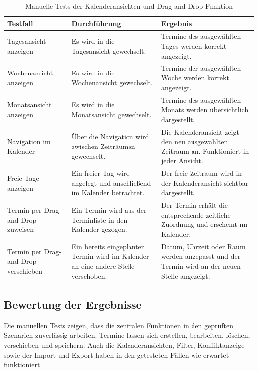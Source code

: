 \documentclass[12pt,a4paper]{article}
\begin{document}
\begin{table}[H]
\centering
\small
\caption{Manuelle Tests der Kalenderansichten und Drag-and-Drop-Funktion}
\label{tab:test-kalender-dragdrop}
\begin{tabularx}{\textwidth}{|L{3cm}|Y|Y|}
\hline
\textbf{Testfall} & \textbf{Durchführung} & \textbf{Ergebnis} \\
\hline
Tagesansicht anzeigen & Es wird in die Tagesansicht gewechselt. & Termine des ausgewählten Tages werden korrekt angezeigt. \\
\hline
Wochenansicht anzeigen & Es wird in die Wochenansicht gewechselt. & Termine der ausgewählten Woche werden korrekt angezeigt. \\
\hline
Monatsansicht anzeigen & Es wird in die Monatsansicht gewechselt. & Termine des ausgewählten Monats werden übersichtlich dargestellt. \\
\hline
Navigation im Kalender & Über die Navigation wird zwischen Zeiträumen gewechselt. & Die Kalenderansicht zeigt den neu ausgewählten Zeitraum an. Funktioniert in jeder Ansicht. \\
\hline
Freie Tage anzeigen & Ein freier Tag wird angelegt und anschließend im Kalender betrachtet. & Der freie Zeitraum wird in der Kalenderansicht sichtbar dargestellt. \\
\hline
Termin per Drag-and-Drop zuweisen & Ein Termin wird aus der Terminliste in den Kalender gezogen. & Der Termin erhält die entsprechende zeitliche Zuordnung und erscheint im Kalender. \\
\hline
Termin per Drag-and-Drop verschieben & Ein bereits eingeplanter Termin wird im Kalender an eine andere Stelle verschoben. & Datum, Uhrzeit oder Raum werden angepasst und der Termin wird an der neuen Stelle angezeigt. \\
\hline
\end{tabularx}
\end{table}

\FloatBarrier

\subsection{Bewertung der Ergebnisse}

Die manuellen Tests zeigen, dass die zentralen Funktionen in den geprüften Szenarien zuverlässig arbeiten. Termine lassen sich erstellen, bearbeiten, löschen, verschieben und speichern. Auch die Kalenderansichten, Filter, Konfliktanzeige sowie der Import und Export haben in den getesteten Fällen wie erwartet funktioniert.
\end{document}
